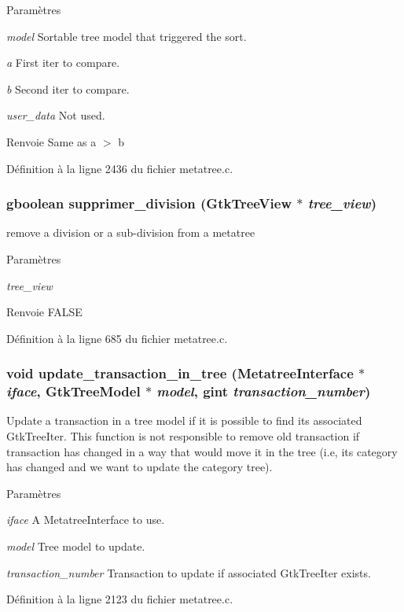 \begin{DoxyParams}{Paramètres}
\item[{\em model}]Sortable tree model that triggered the sort. \item[{\em a}]First iter to compare. \item[{\em b}]Second iter to compare. \item[{\em user\_\-data}]Not used.\end{DoxyParams}
\begin{DoxyReturn}{Renvoie}
Same as a $>$ b 
\end{DoxyReturn}


Définition à la ligne 2436 du fichier metatree.c.

\subsubsection[{supprimer\_\-division}]{\setlength{\rightskip}{0pt plus 5cm}gboolean supprimer\_\-division (GtkTreeView $\ast$ {\em tree\_\-view})}\label{metatree_8h_a60d43ade0aa1dad68c8b3d87c5200dd1}
remove a division or a sub-\/division from a metatree


\begin{DoxyParams}{Paramètres}
\item[{\em tree\_\-view}]\end{DoxyParams}
\begin{DoxyReturn}{Renvoie}
FALSE 
\end{DoxyReturn}


Définition à la ligne 685 du fichier metatree.c.

\subsubsection[{update\_\-transaction\_\-in\_\-tree}]{\setlength{\rightskip}{0pt plus 5cm}void update\_\-transaction\_\-in\_\-tree ({\bf MetatreeInterface} $\ast$ {\em iface}, \/  GtkTreeModel $\ast$ {\em model}, \/  gint {\em transaction\_\-number})}\label{metatree_8h_afd46b955f542c4091bce75608dcc8504}
Update a transaction in a tree model if it is possible to find its associated GtkTreeIter. This function is not responsible to remove old transaction if transaction has changed in a way that would move it in the tree (i.e, its category has changed and we want to update the category tree).


\begin{DoxyParams}{Paramètres}
\item[{\em iface}]A MetatreeInterface to use. \item[{\em model}]Tree model to update. \item[{\em transaction\_\-number}]Transaction to update if associated GtkTreeIter exists. \end{DoxyParams}


Définition à la ligne 2123 du fichier metatree.c.

